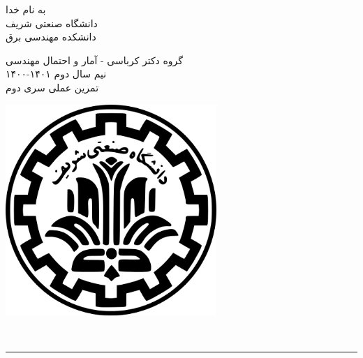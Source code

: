 \documentclass[a4paper]{article}
\begin{document}
\begin{minipage}{0.6\textwidth}
\begin{bf}
\begin{center}
	به نام خدا\\
	\vspace{0.25cm}
	دانشگاه صنعتی شریف\\
	\vspace{0.25cm}
	دانشکده مهندسی برق\\
	\vspace{0.5cm}

\large
گروه دکتر کرباسی - آمار و احتمال مهندسی \\
نیم سال دوم
۱۴۰۱-۱۴۰۰\\
\Large
\vspace{0.4cm}
تمرین عملی سری دوم \\
\end{center}
\end{bf}
\normalsize
\end{minipage} \hfill
\begin{minipage}{0.35\textwidth}
\begin{flushleft}
\includegraphics[width=0.6\textwidth]{Shariflogo.png}\\ \large
\end{flushleft}

 \end{minipage}
\\

\rule[0.1\baselineskip]{\textwidth}{1.5pt}

\large
\end{document}
